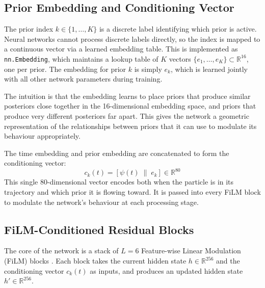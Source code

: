 \subsection{Prior Embedding and 
Conditioning Vector}

The prior index $k \in \{1, \ldots, K\}$ 
is a discrete label identifying which 
prior is active. Neural networks cannot 
process discrete labels directly, so the 
index is mapped to a continuous vector 
via a learned embedding table. This is 
implemented as \texttt{nn.Embedding}, 
which maintains a lookup table of $K$ 
vectors $\{e_1, \ldots, e_K\} \subset 
\mathbb{R}^{16}$, one per prior. The 
embedding for prior $k$ is simply 
$e_k$, which is learned jointly with 
all other network parameters during 
training.

The intuition is that the embedding 
learns to place priors that produce 
similar posteriors close together in 
the 16-dimensional embedding space, 
and priors that produce very different 
posteriors far apart. This gives the 
network a geometric representation of 
the relationships between priors that 
it can use to modulate its behaviour 
appropriately.

The time embedding and prior embedding 
are concatenated to form the conditioning 
vector:
\begin{equation}
    c_k(t) = [\psi(t) \;\|\; e_k] 
    \in \mathbb{R}^{80}
    \label{eq:cond_vec}
\end{equation}
This single 80-dimensional vector 
encodes both when the particle is in 
its trajectory and which prior it is 
flowing toward. It is passed into 
every FiLM block to modulate the 
network's behaviour at each processing 
stage.

\subsection{FiLM-Conditioned Residual 
Blocks}

The core of the network is a stack of 
$L = 6$ Feature-wise Linear Modulation 
(FiLM) blocks \citep{perez2018}. 
Each block takes the current hidden 
state $h \in \mathbb{R}^{256}$ and the 
conditioning vector $c_k(t)$ as inputs, 
and produces an updated hidden state 
$h' \in \mathbb{R}^{256}$.


